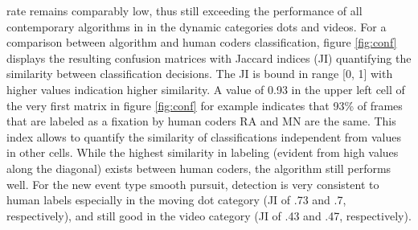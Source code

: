     rate remains comparably low, thus still exceeding the performance of all contemporary algorithms in
    \citet{Andersson2017} in the dynamic categories dots and videos. For a comparison between algorithm and human
    coders classification, figure \ref{fig:conf} displays the resulting
    confusion matrices with Jaccard indices (JI) quantifying the similarity between classification decisions. The
    JI is bound in range [0, 1] with higher values indication higher similarity. A value of 0.93 in the upper
    left cell of the very first matrix in figure \ref{fig:conf} for example indicates that 93\% of frames that are
    labeled as a fixation by human coders RA and MN are the same. This index allows to quantify the similarity of
    classifications independent from values in other cells. While the highest similarity in labeling (evident from
    high values along the diagonal) exists between human coders, the algorithm still performs well. For the new event
    type smooth pursuit, detection is very consistent to human labels especially in the moving dot category (JI of
    .73 and .7, respectively), and still good in the video category (JI of .43 and .47, respectively).\\

